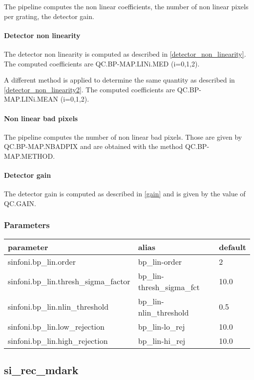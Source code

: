 The pipeline computes the non linear coefficients, the number of non linear
pixels per grating, the detector gain. 

\paragraph{Detector non linearity}
The detector non linearity is computed as described in
\ref{detector_non_linearity}. The computed coefficients are
QC.BP-MAP.LINi.MED (i=0,1,2).

A different method is applied to determine the same quantity as described in
\ref{detector_non_linearity2}. The computed coefficients are
QC.BP-MAP.LINi.MEAN (i=0,1,2).

\paragraph{Non linear bad pixels}
The pipeline computes the number of non linear bad pixels. Those are given
by QC.BP-MAP.NBADPIX and are obtained with the method QC.BP-MAP.METHOD.

\paragraph{Detector gain}
The detector gain is computed as described in \ref{gain} and is given by the
value of QC.GAIN.


\subsubsection{Parameters}
\begin{longtable}{|*3{l|}}
\hline
parameter                                 & alias                      & default \\
\hline
sinfoni.bp\_lin.order                     & bp\_lin-order              & 2
     \\
sinfoni.bp\_lin.thresh\_sigma\_factor     & bp\_lin-thresh\_sigma\_fct & 10.0   \\
sinfoni.bp\_lin.nlin\_threshold           & bp\_lin-nlin\_threshold    & 0.5   \\
sinfoni.bp\_lin.low\_rejection            & bp\_lin-lo\_rej            & 10.0  \\
sinfoni.bp\_lin.high\_rejection           & bp\_lin-hi\_rej            & 10.0  \\
\hline
\end{longtable}


\subsection{si\_rec\_mdark}

